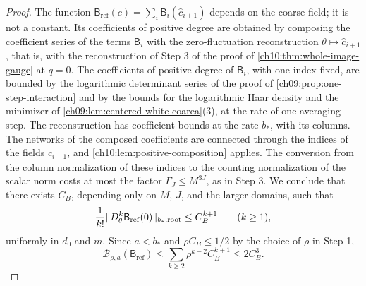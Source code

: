 \begin{proof}
The function $\mathsf B_{\mathrm{ref}}(c)=\sum_i\mathsf B_i(\widehat c_{i+1})$ depends on the coarse field; it is not a constant. Its coefficients of positive degree are obtained by composing the coefficient series of the terms $\mathsf B_i$ with the zero-fluctuation reconstruction $\theta\mapsto\widehat c_{i+1}$, that is, with the reconstruction of Step 3 of the proof of \cref{ch10:thm:whole-image-gauge} at $q=0$. The coefficients of positive degree of $\mathsf B_i$, with one index fixed, are bounded by the logarithmic determinant series of the proof of \cref{ch09:prop:one-step-interaction} and by the bounds for the logarithmic Haar density and the minimizer of \cref{ch09:lem:centered-white-coarea}(3), at the rate of one averaging step. The reconstruction has coefficient bounds at the rate $b_*$, with its columns. The networks of the composed coefficients are connected through the indices of the fields $\widehat c_{i+1}$, and \cref{ch10:lem:positive-composition} applies. The conversion from the column normalization of these indices to the counting normalization of the scalar norm costs at most the factor $\Gamma_J\le M^{3J}$, as in Step 3. We conclude that there exists $C_B$, depending only on $M$, $J$, and the larger domains, such that
\[
 \frac1{k!}\lVert D^k_\theta\mathsf B_{\mathrm{ref}}(0)\rVert_{b_*,\mathrm{root}}\le C_B^{k+1}\qquad(k\ge1),
\]
uniformly in $d_0$ and $m$. Since $a<b_*$ and $\rho C_B\le1/2$ by the choice of $\rho$ in Step 1,
\[
 \mathcal B_{\rho,a}(\mathsf B_{\mathrm{ref}})\le\sum_{k\ge2}\rho^{k-2}C_B^{k+1}\le2C_B^3.
\]


\end{proof}
